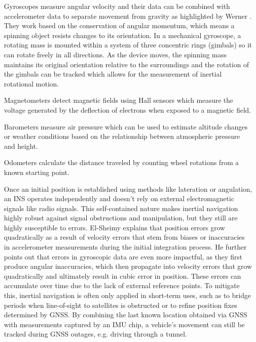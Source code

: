 Gyroscopes measure angular velocity and their data can be combined with accelerometer data to separate movement from gravity as highlighted by Werner \cite{werner2014indoor}. 
They work based on the conservation of angular momentum, which means a spinning object resists changes to its orientation.
In a mechanical gyroscope, a rotating mass is mounted within a system of three concentric rings (gimbals) so it can rotate freely in all directions. 
As the device moves, the spinning mass maintains its original orientation relative to the surroundings and the rotation of the gimbals can be tracked which allows for the measurement of inertial rotational motion.

Magnetometers detect magnetic fields using Hall sensors which measure the voltage generated by the deflection of electrons when exposed to a magnetic field.

Barometers measure air pressure which can be used to estimate altitude changes or weather conditions based on the relationship between atmospheric pressure and height.

Odometers calculate the distance traveled by counting wheel rotations from a known starting point.

Once an initial position is established using methods like lateration or angulation, an \acs{INS} operates independently and doesn't rely on external electromagnetic signals like radio signals. 
This self-contained nature makes inertial navigation highly robust against signal obstructions and manipulation, but they still are highly susceptible to errors.
El-Sheimy \cite{sheimy2006ins} explains that position errors grow quadratically as a result of velocity errors that stem from biases or inaccuracies in accelerometer measurements during the initial integration process. 
He further points out that errors in gyroscopic data are even more impactful, as they first produce angular inaccuracies, which then propagate into velocity errors that grow quadratically and ultimately result in cubic error in position. 
These errors can accumulate over time due to the lack of external reference points. 
To mitigate this, inertial navigation is often only applied in short-term uses, such as to bridge periods when line-of-sight to satellites is obstructed or to refine position fixes determined by \acs{GNSS}. 
By combining the last known location obtained via \acs{GNSS} with measurements captured by an \acs{IMU} chip, a vehicle's movement can still be tracked during GNSS outages, e.g. driving through a tunnel. 

